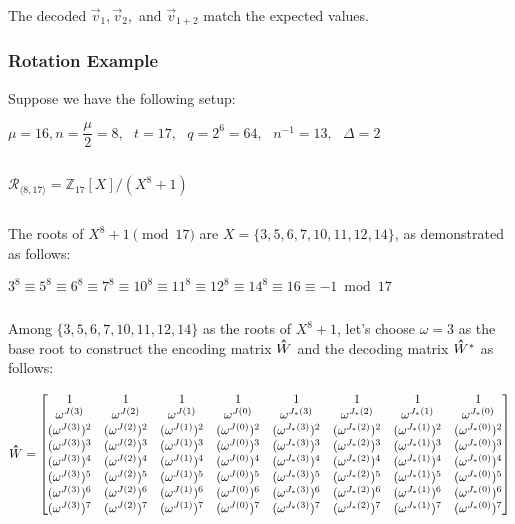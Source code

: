 $ $

The decoded $\vec{v}_1, \vec{v}_2,$ and $\vec{v}_{1+2}$ match the expected values.  




\subsubsection{Rotation Example}
\label{subsubsec:bfv-rotation-ex}

Suppose we have the following setup: 

$\mu = 16, n = \dfrac{\mu}{2} = 8, \text{ } t = 17, \text{ } q = 2^6 = 64, \text{ } n^{-1} = 13, \text{ } \Delta = 2$

$ $

$\mathcal{R}_{\langle 8, 17 \rangle} = \mathbb{Z}_{17}[X] / (X^8 + 1)$

$ $

The roots of $X^8 + 1 \pmod{17}$ are $X = \{3, 5, 6, 7, 10, 11, 12, 14\}$, as demonstrated as follows:

$3^8 \equiv 5^8 \equiv 6^8 \equiv 7^8 \equiv 10^8 \equiv 11^8 \equiv 12^8 \equiv 14^8 \equiv 16 \equiv -1 \bmod{17}$


$ $

Among $\{3, 5, 6, 7, 10, 11, 12, 14\}$ as the roots of $X^8 + 1$, let's choose $\omega = 3$ as the base root to construct the encoding matrix $\hathat W$ and the decoding matrix $\hathat W^*$ as follows: 

$\hathat W = \begin{bmatrix}
1 & 1 & 1 & 1 & 1 & 1 & 1 & 1\\
\omega^{J(3)} & \omega^{J(2)} & \omega^{J(1)} & \omega^{J(0)} & \omega^{J_*(3)} & \omega^{J_*(2)} & \omega^{J_*(1)} & \omega^{J_*(0)}\\
(\omega^{J(3)})^2 & (\omega^{J(2)})^2 & (\omega^{J(1)})^2 & (\omega^{J(0)})^2 & (\omega^{J_*(3)})^2 & (\omega^{J_*(2)})^2 & (\omega^{J_*(1)})^2 & (\omega^{J_*(0)})^2\\
(\omega^{J(3)})^3 & (\omega^{J(2)})^3 & (\omega^{J(1)})^3 & (\omega^{J(0)})^3 & (\omega^{J_*(3)})^3 & (\omega^{J_*(2)})^3 & (\omega^{J_*(1)})^3 & (\omega^{J_*(0)})^3\\
(\omega^{J(3)})^4 & (\omega^{J(2)})^4 & (\omega^{J(1)})^4 & (\omega^{J(0)})^4 & (\omega^{J_*(3)})^4 & (\omega^{J_*(2)})^4 & (\omega^{J_*(1)})^4 & (\omega^{J_*(0)})^4\\
(\omega^{J(3)})^5 & (\omega^{J(2)})^5 & (\omega^{J(1)})^5 & (\omega^{J(0)})^5 & (\omega^{J_*(3)})^5 & (\omega^{J_*(2)})^5 & (\omega^{J_*(1)})^5 & (\omega^{J_*(0)})^5\\
(\omega^{J(3)})^6 & (\omega^{J(2)})^6 & (\omega^{J(1)})^6 & (\omega^{J(0)})^6 & (\omega^{J_*(3)})^6 & (\omega^{J_*(2)})^6 & (\omega^{J_*(1)})^6 & (\omega^{J_*(0)})^6\\
(\omega^{J(3)})^7 & (\omega^{J(2)})^7 & (\omega^{J(1)})^7 & (\omega^{J(0)})^7 & (\omega^{J_*(3)})^7 & (\omega^{J_*(2)})^7 & (\omega^{J_*(1)})^7 & (\omega^{J_*(0)})^7\\
\end{bmatrix}$ 


